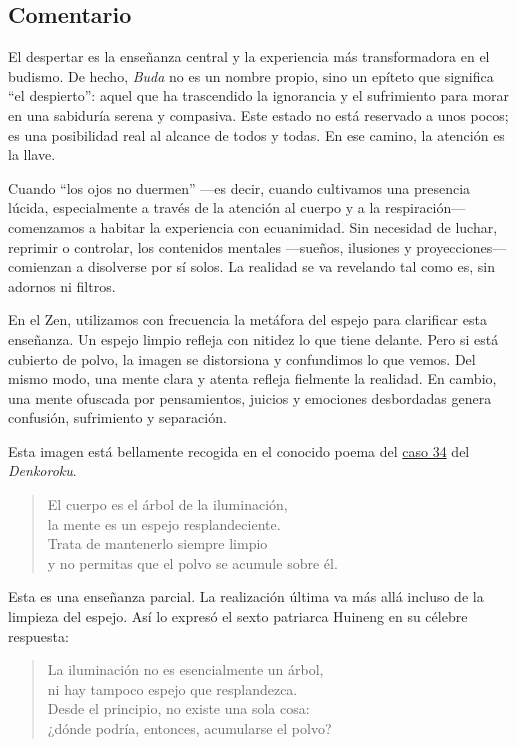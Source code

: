 \documentclass[
  a5paperpaper,
]{article}
\begin{document}
\hfill\break

\hypertarget{comentario-46}{%
\subsection{Comentario}\label{comentario-46}}

El despertar es la enseñanza central y la experiencia más transformadora
en el budismo. De hecho, \emph{Buda} no es un nombre propio, sino un
epíteto que significa ``el despierto'': aquel que ha trascendido la
ignorancia y el sufrimiento para morar en una sabiduría serena y
compasiva. Este estado no está reservado a unos pocos; es una
posibilidad real al alcance de todos y todas. En ese camino, la atención
es la llave.

Cuando ``los ojos no duermen'' ---es decir, cuando cultivamos una
presencia lúcida, especialmente a través de la atención al cuerpo y a la
respiración--- comenzamos a habitar la experiencia con ecuanimidad. Sin
necesidad de luchar, reprimir o controlar, los contenidos mentales
---sueños, ilusiones y proyecciones--- comienzan a disolverse por sí
solos. La realidad se va revelando tal como es, sin adornos ni filtros.

En el Zen, utilizamos con frecuencia la metáfora del espejo para
clarificar esta enseñanza. Un espejo limpio refleja con nitidez lo que
tiene delante. Pero si está cubierto de polvo, la imagen se distorsiona
y confundimos lo que vemos. Del mismo modo, una mente clara y atenta
refleja fielmente la realidad. En cambio, una mente ofuscada por
pensamientos, juicios y emociones desbordadas genera confusión,
sufrimiento y separación.

Esta imagen está bellamente recogida en el conocido poema del
\href{https://www.daizansoriano.com/ta-chien-hui-neng/}{caso 34} del
\emph{Denkoroku}.

\begin{quote}
El cuerpo es el árbol de la iluminación,\\
la mente es un espejo resplandeciente.\\
Trata de mantenerlo siempre limpio\\
y no permitas que el polvo se acumule sobre él.
\end{quote}

Esta es una enseñanza parcial. La realización última va más allá incluso
de la limpieza del espejo. Así lo expresó el sexto patriarca Huineng en
su célebre respuesta:

\begin{quote}
La iluminación no es esencialmente un árbol,\\
ni hay tampoco espejo que resplandezca.\\
Desde el principio, no existe una sola cosa:\\
¿dónde podría, entonces, acumularse el polvo?
\end{quote}
\end{document}
